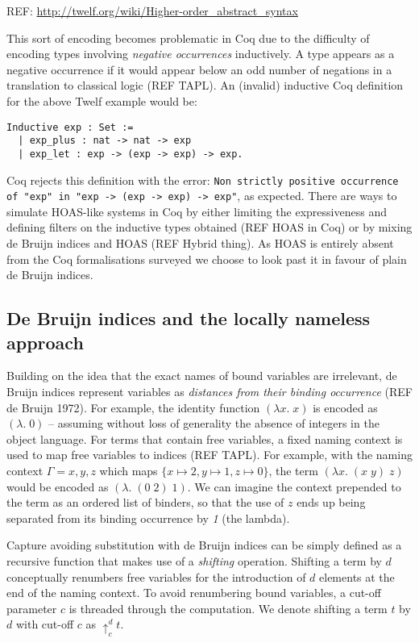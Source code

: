\documentclass[]{unswthesis}
\begin{document}
REF: \url{http://twelf.org/wiki/Higher-order_abstract_syntax}

This sort of encoding becomes problematic in Coq due to the difficulty of encoding types involving \textit{negative occurrences} inductively. A type appears as a negative occurrence if it would appear below an odd number of negations in a translation to classical logic (REF TAPL). An (invalid) inductive Coq definition for the above Twelf example would be:

\begin{verbatim}
Inductive exp : Set :=
  | exp_plus : nat -> nat -> exp
  | exp_let : exp -> (exp -> exp) -> exp.
\end{verbatim}

Coq rejects this definition with the error: \texttt{Non strictly positive occurrence of "exp" in
 "exp -> (exp -> exp) -> exp"}, as expected. There are ways to simulate HOAS-like systems in Coq by either limiting the expressiveness and defining filters on the inductive types obtained (REF HOAS in Coq) or by mixing de Bruijn indices and HOAS (REF Hybrid thing). As HOAS is entirely absent from the Coq formalisations surveyed we choose to look past it in favour of plain de Bruijn indices.

\subsection{De Bruijn indices and the locally nameless approach}
\label{sec:de_bruijn}

Building on the idea that the exact names of bound variables are irrelevant, de Bruijn indices represent variables as \textit{distances from their binding occurrence} (REF de Bruijn 1972). For example, the identity function $(\lambda x. \; x)$ is encoded as $(\lambda . \; 0)$ -- assuming without loss of generality the absence of integers in the object language. For terms that contain free variables, a fixed naming context is used to map free variables to indices (REF TAPL). For example, with the naming context $\Gamma = x, y, z$ which maps $\{x \mapsto 2, y \mapsto 1, z \mapsto 0\}$, the term $(\lambda x. \; (x \; y) \; z)$ would be encoded as $(\lambda. \; (0 \; 2) \; 1)$. We can imagine the context prepended to the term as an ordered list of binders, so that the use of $z$ ends up being separated from its binding occurrence by \textit{1} (the lambda).

Capture avoiding substitution with de Bruijn indices can be simply defined as a recursive function that makes use of a \textit{shifting} operation. Shifting a term by $d$ conceptually renumbers free variables for the introduction of $d$ elements at the end of the naming context. To avoid renumbering bound variables, a cut-off parameter $c$ is threaded through the computation. We denote shifting a term $t$ by $d$ with cut-off $c$ as $\uparrow^d_c t$.
\end{document}
